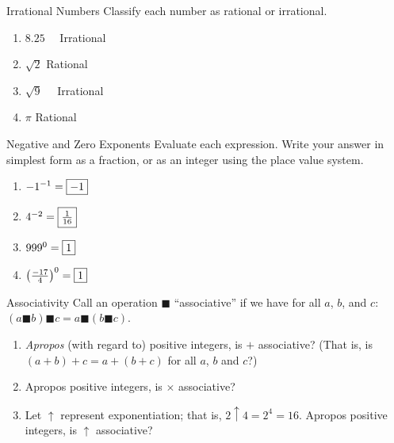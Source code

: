 \documentclass[12pt,letterpaper]{article}
\begin{document}
\begin{problem}{Irrational Numbers}
 Classify each number as rational or irrational.

 \begin{enumerate}[\hspace{.5cm}a.]
  \item $8.25$ \hfill {}~~Irrational
  \item $\sqrt{2}$ \hfill Rational~~
  \item $\sqrt{9}$ \hfill {}~~Irrational
  \item $\pi$ \hfill Rational~~
 \end{enumerate}
\end{problem}

\begin{problem}{Negative and Zero Exponents}
 Evaluate each expression. Write your answer in simplest form as a fraction, or
 as an integer using the place value system.

 \begin{enumerate}[\hspace{.5cm}a.]
  \item ${-1}^{-1}=\framebox{$-1$}$
  \item $4^{-2}=\framebox{$\frac{1}{16}$}$
  \item ${999}^0=\framebox{$1$}$
  \item ${\left(\frac{-17}{4}\right)}^0=\framebox{$1$}$
 \end{enumerate}
\end{problem}

\begin{problem}{Associativity}
 Call an operation $\blacksquare$ ``associative'' if we have for all $a$, $b$,
 and $c$: $(a \blacksquare b) \blacksquare c = a \blacksquare (b \blacksquare
 c)$.

 \begin{enumerate}[\hspace{.5cm}a.]
  \item \emph{Apropos} (with regard to) positive integers, is $+$ associative?
  (That is, is $(a+b)+c=a+(b+c)$ for all $a$, $b$ and $c$?) 
  \item Apropos positive integers, is $\times$ associative? 
  \item Let $\uparrow$ represent exponentiation; that is, $2\uparrow4=2^4=16$.
  Apropos positive integers, is $\uparrow$ associative? 
 \end{enumerate}
\end{problem}
\end{document}
